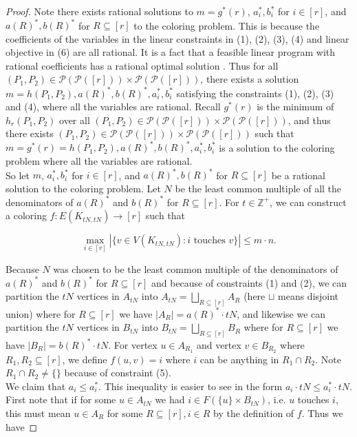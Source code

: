 \documentclass{article}
\begin{document}
\begin{proof}
Note there exists rational solutions to $m = g^*(r)$, $a_i^*,b_i^*$ for $i \in [r]$, and $a(R)^*,b(R)^*$ for $R \subseteq [r]$ to the coloring problem. This is because the coefficients of the variables in the linear constraints in (1), (2), (3), (4) and linear objective in (6) are all rational. It is a fact that a feasible linear program with rational coefficients has a rational optimal solution \cite{ration}. Thus for all $(P_1,P_2) \in \mathcal{P}(\mathcal{P}([r])) \times \mathcal{P}(\mathcal{P}([r]))$, there exists a solution $m=h(P_1,P_2),a(R)^*,b(R)^*,a_i^*,b_i^*$ satisfying the constraints (1), (2), (3) and (4), where all the variables are rational. Recall $g^*(r)$ is the minimum of $h_r(P_1,P_2)$ over all $(P_1,P_2) \in \mathcal{P}(\mathcal{P}([r])) \times \mathcal{P}(\mathcal{P}([r]))$, and thus there exists $(P_1,P_2) \in \mathcal{P}(\mathcal{P}([r])) \times \mathcal{P}(\mathcal{P}([r]))$ such that $m=g^*(r)=h(P_1,P_2),a(R)^*,b(R)^*,a_i^*,b_i^*$ is a solution to the coloring problem where all the variables are rational. \\

So let $m$, $a_i^*,b_i^*$ for $i \in [r]$, and $a(R)^*,b(R)^*$ for $R \subseteq [r]$ be a rational solution to the coloring problem. Let $N$ be the least common multiple of all the denominators of $a(R)^*$ and $b(R)^*$ for $R \subseteq [r]$. For $t \in \mathbb{Z}^{+}$, we can construct a coloring $f : E(K_{tN,tN}) \rightarrow [r]$ such that 

$$\max_{i \in [r]} |\{v \in V(K_{tN,tN}) : i \text{ touches } v\}| \leq m \cdot n.$$

\noindent
Because $N$ was chosen to be the least common multiple of the denominators of $a(R)^*$ and $b(R)^*$ for $R \subseteq [r]$ and because of constraints (1) and (2), we can partition the $tN$ vertices in $A_{tN}$ into $A_{tN} = \bigsqcup_{R \subseteq [r]} A_R$ (here $\sqcup$ means disjoint union) where for $R \subseteq [r]$ we have $|A_R| = a(R)^* \cdot tN$, and likewise we can partition the $tN$ vertices in $B_{tN}$ into $B_{tN} = \bigsqcup_{R \subseteq [r]} B_R$ where for $R \subseteq [r]$ we have $|B_R| = b(R)^* \cdot tN$. For vertex $u \in A_{R_1}$ and vertex $v \in B_{R_2}$ where $R_1,R_2 \subseteq [r]$, we define $f(u,v) = i$ where $i$ can be anything in $R_1 \cap R_2$. Note $R_1 \cap R_2 \neq \{\}$ because of constraint (5). \\

We claim that $a_i \leq a_i^*$. This inequality is easier to see in the form $a_i \cdot tN \leq a_i^* \cdot tN$. First note that if for some $u \in A_{tN}$ we had $i \in F(\{u\} \times B_{tN})$, i.e. $u$ touches $i$, this must mean $u \in A_R$ for some $R \subseteq [r], i \in R$ by the definition of $f$. Thus we have 


\end{proof}
\end{document}
